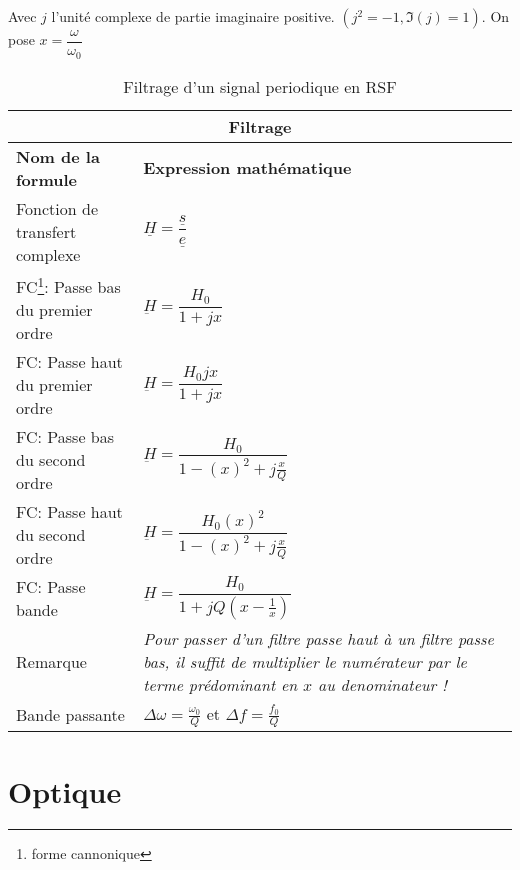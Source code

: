 \documentclass[10pt,a4paper,titlepage,portrait]{article}
\renewcommand{\arraystretch}{2}
\begin{document}
\begin{table}[H]
    \centering
    Avec $j$ l'unité complexe de partie imaginaire positive. $\left(j^2 = -1, \Im(j)=1\right)$. On pose $x = \dfrac{\omega}{\omega_0}$
    \renewcommand{\arraystretch}{1.5} %
    \setlength{\tabcolsep}{8pt} %
    \begin{tabular}{@{}p{9cm}p{10cm}@{}}
        \toprule
        \multicolumn{2}{c}{\textbf{Filtrage}} \\
        \midrule
        \textbf{Nom de la formule} & \textbf{Expression mathématique} \\
        \midrule
        Fonction de transfert complexe & $\underline{H} = \dfrac{\underline{s}}{\underline{e}}$ \\
        FC\footnote{forme cannonique}: Passe bas du premier ordre & $\underbar{H} = \dfrac{H_0}{1+jx}$ \\
        FC: Passe haut du premier ordre & $\underbar{H} = \dfrac{H_0jx}{1+jx}$ \\ 
        FC: Passe bas du second ordre & $\underbar{H} = \dfrac{H_0}{1-\left(x\right)^2 + j\frac{x}{Q}}$ \\
        FC: Passe haut du second ordre & $\underbar{H} = \dfrac{H_0\left(x\right)^2}{1-\left(x\right)^2 + j\frac{x}{Q}}$ \\
        FC: Passe bande & $\underbar{H} = \dfrac{H_0}{1+jQ\left(x-\frac{1}{x}\right)}$ \\ 
        Remarque & \textit{Pour passer d'un filtre passe haut à un filtre passe bas, il suffit de multiplier le numérateur par le terme prédominant en $x$ au denominateur !} \\ 
        Bande passante & $\Delta\omega = \frac{\omega_0}{Q}$ et $\Delta f=\frac{f_0}{Q}$\\
    \bottomrule
\end{tabular}
\caption{Filtrage d'un signal periodique en RSF}
\label{tab:filtrage}
\end{table}



\section{Optique}
\end{document}
